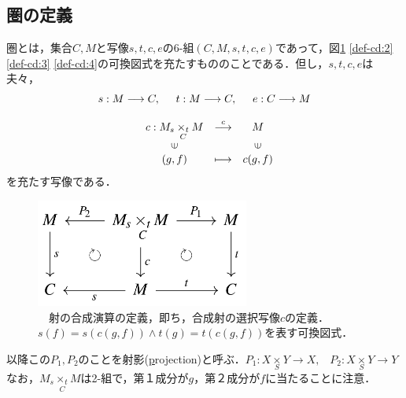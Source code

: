 \documentclass[uplatex, 12pt, a4paper, dvipdfmx]{jsarticle}
\begin{document}
\subsection{圏の定義}
\begin{shadebox}\begin{definition}[圏]\label{def-category}圏とは，集合$C,M$と写像$s,t,c,e$の6-組$(C,M,s,t,c,e)$であって，図\ref{def-cd:1} \ref{def-cd:2} \ref{def-cd:3} \ref{def-cd:4}の可換図式を充たすもののことである．但し，$s,t,c,e$は夫々，\begin{eqnarray*}s:M\longrightarrow C,\hspace{5mm} t:M\longrightarrow C, \hspace{5mm} e:C\longrightarrow M\\[3mm] \left. 
\begin{array}{ccc}
    c:M_s\underset{C}{\times_t}M & \stackrel{c}{\longrightarrow} & M \\
    \rotatebox{90}{$\in$} & & \rotatebox{90}{$\in$} \\
    (g,f) & \longmapsto & c(g,f)
\end{array} \right. \hspace{10mm} \end{eqnarray*}を充たす写像である．

\vspace{1mm} \end{definition}\end{shadebox}

\begin{figure}[ht] \begin{center}  \caption{\label{def-cd:1}　射の合成演算の定義，即ち，合成射の選択写像$c$の定義．$s(f)=s(c(g,f))\wedge t(g)=t(c(g,f))$を表す可換図式．}
    \includegraphics[width=7cm]{cd-1.png}
\end{center}\end{figure}
以降この$P_1, P_2$のことを射影(\underline{p}rojection)と呼ぶ．\hspace{6mm}$P_1: X\underset{S}{\times}Y \longrightarrow X, \; \; \; P_2: X\underset{S}{\times}Y \longrightarrow Y$\\
なお，$M_s\underset{C}{\times_t}M$は2-組で，第１成分が$g$，第２成分が$f$に当たることに注意．
\end{document}
